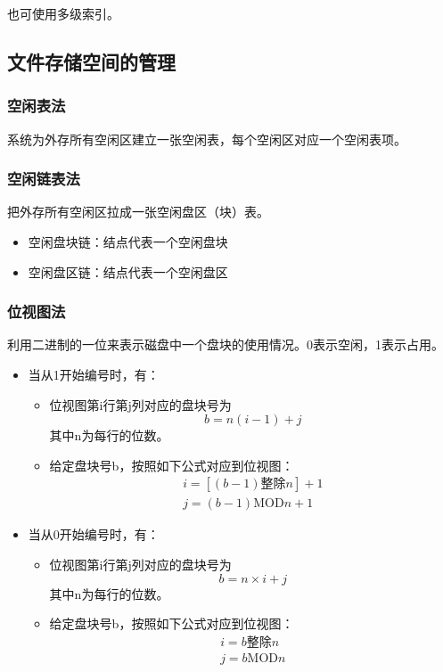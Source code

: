 \documentclass[12pt, a4paper, oneside]{ctexart}
\begin{document}
也可使用多级索引。

\subsection{文件存储空间的管理}

\subsubsection{空闲表法}

系统为外存所有空闲区建立一张空闲表，每个空闲区对应一个空闲表项。

\subsubsection{空闲链表法}

把外存所有空闲区拉成一张空闲盘区（块）表。
\begin{itemize}
    \item 空闲盘块链：结点代表一个空闲盘块
    \item 空闲盘区链：结点代表一个空闲盘区
\end{itemize}

\subsubsection{位视图法}

利用二进制的一位来表示磁盘中一个盘块的使用情况。0表示空闲，1表示占用。



\begin{itemize}
    \item 当从1开始编号时，有：
    \begin{itemize}
        \item 位视图第i行第j列对应的盘块号为
        \begin{equation}
            b=n(i-1)+j
        \end{equation}
        其中n为每行的位数。
        \item 给定盘块号b，按照如下公式对应到位视图：
        \begin{gather}
            i=[(b-1)\text{整除}n]+1 \\
            j=(b-1)\text{MOD}n+1
        \end{gather}
    \end{itemize}
    \item 当从0开始编号时，有：
    \begin{itemize}
        \item 位视图第i行第j列对应的盘块号为
        \begin{equation}
            b=n\times i+j
        \end{equation}
        其中n为每行的位数。
        \item 给定盘块号b，按照如下公式对应到位视图：
        \begin{gather}
            i=b\text{整除}n \\
            j=b\text{MOD}n
        \end{gather}
    \end{itemize}
\end{itemize}
\end{document}
